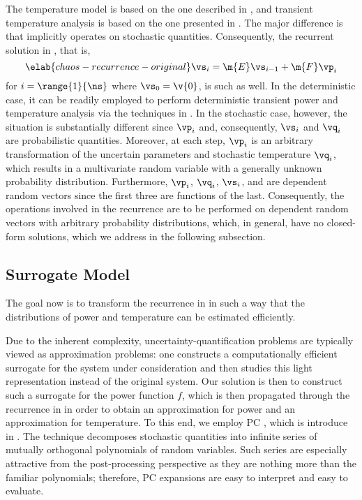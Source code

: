 The temperature model is based on the one described in ,
and transient temperature analysis is based on the one presented in
. The major difference is that
 implicitly operates on stochastic quantities.
Consequently, the recurrent solution in , that
is,
\begin{equation} \elab{chaos-recurrence-original}
  \vs_i = \m{E} \vs_{i - 1} + \m{F} \vp_i
\end{equation}
for $i = \range{1}{\ns}$ where $\vs_0 = \v{0}$, is such as well. In the
deterministic case, it can be readily employed to perform deterministic
transient power and temperature analysis via the techniques in
. In the stochastic case, however, the
situation is substantially different since $\vp_i$ and, consequently, $\vs_i$
and $\vq_i$ are probabilistic quantities. Moreover, at each step, $\vp_i$ is an
arbitrary transformation of the uncertain parameters \vu and stochastic
temperature $\vq_i$, which results in a multivariate random variable with a
generally unknown probability distribution. Furthermore, $\vp_i$, $\vq_i$,
$\vs_i$, and \vu are dependent random vectors since the first three are
functions of the last. Consequently, the operations involved in the recurrence
are to be performed on dependent random vectors with arbitrary probability
distributions, which, in general, have no closed-form solutions, which we
address in the following subsection.

\subsection{Surrogate Model}

The goal now is to transform the recurrence in 
in such a way that the distributions of power and temperature can be estimated
efficiently.

Due to the inherent complexity, uncertainty-quantification problems are
typically viewed as approximation problems: one constructs a computationally
efficient surrogate for the system under consideration and then studies this
light representation instead of the original system. Our solution is then to
construct such a surrogate for the power function $f$, which is then propagated
through the recurrence in  in order to obtain an
approximation for power and an approximation for temperature. To this end, we
employ \acf{PC} \cite{xiu2010}, which is introduce in .
The technique decomposes stochastic quantities into infinite series of mutually
orthogonal polynomials of random variables. Such series are especially
attractive from the post-processing perspective as they are nothing more than
the familiar polynomials; therefore, \ac{PC} expansions are easy to interpret
and easy to evaluate.

